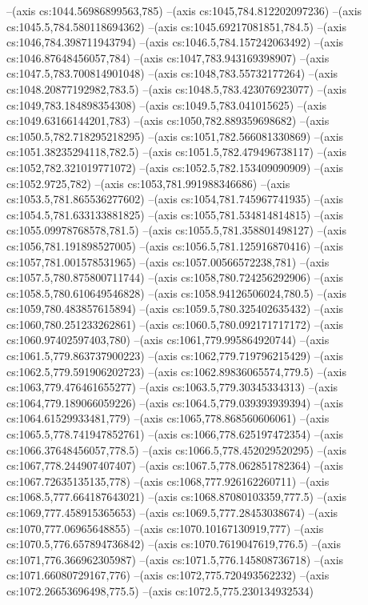 --(axis cs:1044.56986899563,785)
--(axis cs:1045,784.812202097236)
--(axis cs:1045.5,784.580118694362)
--(axis cs:1045.69217081851,784.5)
--(axis cs:1046,784.398711943794)
--(axis cs:1046.5,784.157242063492)
--(axis cs:1046.87648456057,784)
--(axis cs:1047,783.943169398907)
--(axis cs:1047.5,783.700814901048)
--(axis cs:1048,783.55732177264)
--(axis cs:1048.20877192982,783.5)
--(axis cs:1048.5,783.423076923077)
--(axis cs:1049,783.184898354308)
--(axis cs:1049.5,783.041015625)
--(axis cs:1049.63166144201,783)
--(axis cs:1050,782.889359698682)
--(axis cs:1050.5,782.718295218295)
--(axis cs:1051,782.566081330869)
--(axis cs:1051.38235294118,782.5)
--(axis cs:1051.5,782.479496738117)
--(axis cs:1052,782.321019771072)
--(axis cs:1052.5,782.153409090909)
--(axis cs:1052.9725,782)
--(axis cs:1053,781.991988346686)
--(axis cs:1053.5,781.865536277602)
--(axis cs:1054,781.745967741935)
--(axis cs:1054.5,781.633133881825)
--(axis cs:1055,781.534814814815)
--(axis cs:1055.09978768578,781.5)
--(axis cs:1055.5,781.358801498127)
--(axis cs:1056,781.191898527005)
--(axis cs:1056.5,781.125916870416)
--(axis cs:1057,781.001578531965)
--(axis cs:1057.00566572238,781)
--(axis cs:1057.5,780.875800711744)
--(axis cs:1058,780.724256292906)
--(axis cs:1058.5,780.610649546828)
--(axis cs:1058.94126506024,780.5)
--(axis cs:1059,780.483857615894)
--(axis cs:1059.5,780.325402635432)
--(axis cs:1060,780.251233262861)
--(axis cs:1060.5,780.092171717172)
--(axis cs:1060.97402597403,780)
--(axis cs:1061,779.995864920744)
--(axis cs:1061.5,779.863737900223)
--(axis cs:1062,779.719796215429)
--(axis cs:1062.5,779.591906202723)
--(axis cs:1062.89836065574,779.5)
--(axis cs:1063,779.476461655277)
--(axis cs:1063.5,779.30345334313)
--(axis cs:1064,779.189066059226)
--(axis cs:1064.5,779.039393939394)
--(axis cs:1064.61529933481,779)
--(axis cs:1065,778.868560606061)
--(axis cs:1065.5,778.741947852761)
--(axis cs:1066,778.625197472354)
--(axis cs:1066.37648456057,778.5)
--(axis cs:1066.5,778.452029520295)
--(axis cs:1067,778.244907407407)
--(axis cs:1067.5,778.062851782364)
--(axis cs:1067.72635135135,778)
--(axis cs:1068,777.926162260711)
--(axis cs:1068.5,777.664187643021)
--(axis cs:1068.87080103359,777.5)
--(axis cs:1069,777.458915365653)
--(axis cs:1069.5,777.28453038674)
--(axis cs:1070,777.06965648855)
--(axis cs:1070.10167130919,777)
--(axis cs:1070.5,776.657894736842)
--(axis cs:1070.7619047619,776.5)
--(axis cs:1071,776.366962305987)
--(axis cs:1071.5,776.145808736718)
--(axis cs:1071.66080729167,776)
--(axis cs:1072,775.720493562232)
--(axis cs:1072.26653696498,775.5)
--(axis cs:1072.5,775.230134932534)
